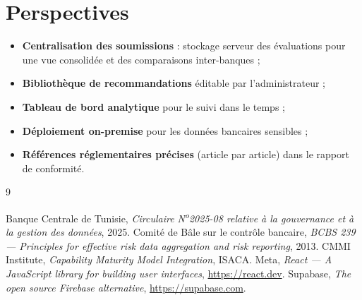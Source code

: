 \documentclass[11pt,a4paper]{report}
\begin{document}
\section{Perspectives}
\begin{itemize}[noitemsep]
  \item \textbf{Centralisation des soumissions} : stockage serveur des
  évaluations pour une vue consolidée et des comparaisons inter-banques ;
  \item \textbf{Bibliothèque de recommandations} éditable par l'administrateur ;
  \item \textbf{Tableau de bord analytique} pour le suivi dans le temps ;
  \item \textbf{Déploiement on-premise} pour les données bancaires sensibles ;
  \item \textbf{Références réglementaires précises} (article par article) dans le
  rapport de conformité.
\end{itemize}

\begin{thebibliography}{9}
 Banque Centrale de Tunisie, \emph{Circulaire N\textsuperscript{o}2025-08
relative à la gouvernance et à la gestion des données}, 2025.
 Comité de Bâle sur le contrôle bancaire, \emph{BCBS 239 —
Principles for effective risk data aggregation and risk reporting}, 2013.
 CMMI Institute, \emph{Capability Maturity Model Integration},
ISACA.
 Meta, \emph{React — A JavaScript library for building user
interfaces}, \url{https://react.dev}.
 Supabase, \emph{The open source Firebase alternative},
\url{https://supabase.com}.
\end{thebibliography}
\end{document}
